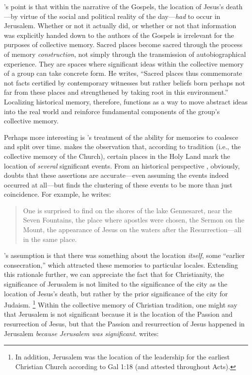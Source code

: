 \halbwachs's point is that within the narrative of the Gospels, the location of Jesus's death---by virtue of the social and political reality of the day---\emph{had} to occur in Jerusalem.\autocite[211]{halbwachs1992} Whether or not it actually did, or whether or not that information was explicitly handed down to the authors of the Gospels is irrelevant for the purposes of collective memory. Sacred places become sacred through the process of memory \emph{construction}, not simply through the transmission of autobiographical experience. They are spaces where significant ideas within the collective memory of a group can take concrete form. He writes, ``Sacred places thus commemorate not facts certified by contemporary witnesses but rather beliefs born perhaps not far from these places and strengthened by taking root in this environment.''\autocite[199]{halbwachs1992} Localizing historical memory, therefore, functions as a way to move abstract ideas into the real world and reinforce fundamental components of the group's collective memory.  

Perhaps more interesting is \halbwachs's treatment of the ability for memories to coalesce and split over time. \halbwachs makes the observation that, according to tradition (i.e., the collective memory of the Church), certain places in the Holy Land mark the location of \emph{several} significant events. From an historical perspective \halbwachs, obviously, doubts that these assertions are accurate---even assuming the events indeed occurred at all---but finds the clustering of these events to be more than just coincidence. For example, he writes:  

\begin{quote}
One is surprised to find on the shores of the lake Gennesaret, near the Seven Fountains, the place where apostles were chosen, the Sermon on the Mount, the appearance of Jesus on the waters after the Resurrection---all in the same place.\autocite[220]{halbwachs1992}
\end{quote}  

\halbwachs's assumption is that there was something about the location \emph{itself}, some ``earlier consecration,''\autocite[220]{halbwachs1992} which attracted these memories to particular locales. Extending this rationale further, we can appreciate the fact that for Christianity, the significance of Jerusalem is not limited to the significance of the city as the location of Jesus's death, but rather by the prior significance of the city for Judaism.%
%
\footnote{In addition, Jerusalem was the location of the leadership for the earliest Christian Church according to Gal 1:18 (and attested throughout Acts).}
%
Within the collective memory of Christian tradition, one might say that Jerusalem is not significant because it is the location of the Passion and resurrection of Jesus, but that the Passion and resurrection of Jesus happened in Jerusalem \emph{because Jerusalem was significant}. \halbwachs writes:  

